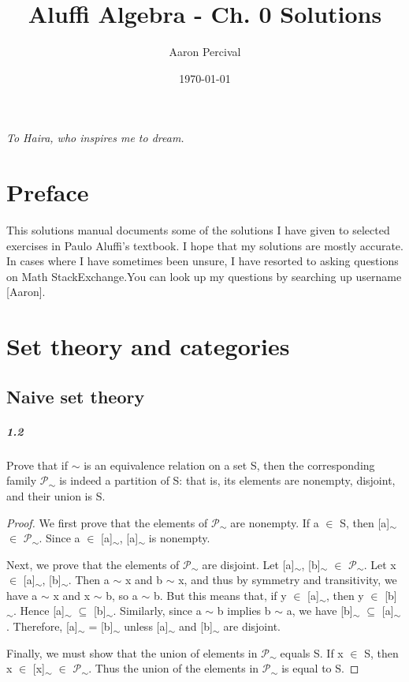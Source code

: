 \documentclass{book}
\title{Aluffi Algebra - Ch. 0 Solutions}
\author{Aaron Percival}
\date{\today}
\begin{document}
\maketitle
\textit{To Haira, who inspires me to dream.}
\tableofcontents
\chapter*{Preface}
This solutions manual documents some of the solutions I have given to selected exercises in Paulo Aluffi's textbook. I hope that my solutions are mostly accurate. In cases where I have sometimes been unsure, I have resorted to asking questions on Math StackExchange.You can look up my questions by searching up username [Aaron].
\chapter{Set theory and categories}
\section{Naive set theory}
\paragraph{1.2} Prove that if $\sim$ is an equivalence relation on a set S, then the corresponding family $\mathscr{P}$\textsubscript{$\sim$} is indeed a partition of S: that is, its elements are nonempty, disjoint, and their union is S.
\begin{proof}
We first prove that the elements of $\mathscr{P}$\textsubscript{$\sim$} are nonempty. If a ${\in}$ S, then [a]\textsubscript{$\sim$} ${\in}$ $\mathscr{P}$\textsubscript{$\sim$}. Since a ${\in}$ [a]\textsubscript{$\sim$}, [a]\textsubscript{$\sim$} is nonempty.

Next, we prove that the elements of $\mathscr{P}$\textsubscript{$\sim$} are disjoint. Let [a]\textsubscript{$\sim$}, [b]\textsubscript{$\sim$} ${\in}$ $\mathscr{P}$\textsubscript{$\sim$}. Let x ${\in}$ [a]\textsubscript{$\sim$}, [b]\textsubscript{$\sim$}. Then a $\sim$ x and b $\sim$ x, and thus by symmetry and transitivity, we have a $\sim$ x and x $\sim$ b, so a $\sim$ b. But this means that, if y $\in$ [a]\textsubscript{$\sim$}, then y $\in$ [b]\textsubscript{$\sim$}. Hence [a]\textsubscript{$\sim$} $\subseteq$ [b]\textsubscript{$\sim$}.  Similarly, since a $\sim$ b implies b $\sim$ a, we have [b]\textsubscript{$\sim$} $\subseteq$ [a]\textsubscript{$\sim$}. Therefore, [a]\textsubscript{$\sim$} = [b]\textsubscript{$\sim$} unless [a]\textsubscript{$\sim$} and [b]\textsubscript{$\sim$} are disjoint.

Finally, we must show that the union of elements in $\mathscr{P}$\textsubscript{$\sim$} equals S. If x $\in$ S, then x $\in$ [x]\textsubscript{$\sim$} $\in$ $\mathscr{P}$\textsubscript{$\sim$}. Thus the union of the elements in $\mathscr{P}$\textsubscript{$\sim$} is equal to S.
\end{proof}	
\end{document}
